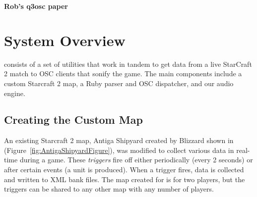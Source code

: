 \documentclass{nime-document-class}
\begin{document}
{\bf Rob's q3osc paper}

\section{System Overview}
\projectName{} consists of a set of utilities that work in tandem to get data from a live StarCraft 2 match to OSC clients that sonify the game.
The main components include a custom Starcraft 2 map, a Ruby parser and OSC dispatcher, and our audio engine.

\subsection{Creating the Custom Map}
An existing Starcraft 2 map, Antiga Shipyard created by Blizzard shown in (Figure~\ref{fig:AntigaShipyardFigure}), was modified to collect various data in real-time during a game.
These {\em triggers} fire off either periodically (every 2 seconds) or after certain events (a unit is produced). When a trigger fires, data is collected and written to XML bank files.
The map created for \projectName{} is for two players, but the triggers can be shared to any other map with any number of players. 
\end{document}
